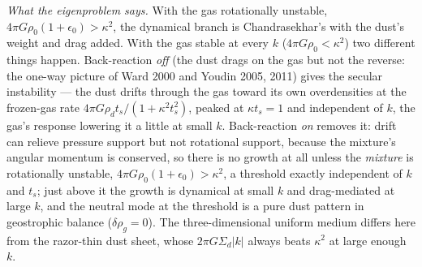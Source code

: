 \documentclass[11pt]{article}
\begin{document}
\emph{What the eigenproblem says.} With the gas rotationally unstable, $4\pi G\rho_0(1
+ \epsilon_0) > \kappa^2$, the dynamical branch is Chandrasekhar's with the dust's
weight and drag added. With the gas stable at every $k$ ($4\pi G\rho_0 < \kappa^2$) two
different things happen. Back-reaction \emph{off} (the dust drags on the gas but not
the reverse: the one-way picture of Ward 2000 and Youdin 2005, 2011) gives the secular
instability --- the dust drifts through the gas toward its own overdensities at the
frozen-gas rate $4\pi G\rho_d t_s/(1 + \kappa^2 t_s^2)$, peaked at $\kappa t_s = 1$
and independent of $k$, the gas's response lowering it a little at small $k$.
Back-reaction \emph{on} removes it: drift can relieve pressure support but not
rotational support, because the mixture's angular momentum is conserved, so there is
no growth at all unless the \emph{mixture} is rotationally unstable, $4\pi G\rho_0(1 +
\epsilon_0) > \kappa^2$, a threshold exactly independent of $k$ and $t_s$; just above
it the growth is dynamical at small $k$ and drag-mediated at large $k$, and the
neutral mode at the threshold is a pure dust pattern in geostrophic balance
($\delta\rho_g = 0$). The three-dimensional uniform medium differs here from the
razor-thin dust sheet, whose $2\pi G\Sigma_d |k|$ always beats $\kappa^2$ at large
enough $k$.
\end{document}
